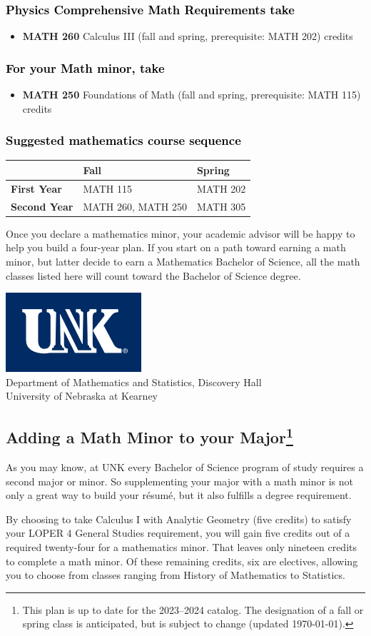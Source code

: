 \documentclass[10pt]{article}
\newcommand{\calconeshort}{MATH 115}
\newcommand{\calctwoshort}{MATH 202}
\newcommand{\foundations}{\textbf{MATH 250} Foundations of Math (fall and spring, prerequisite: MATH 115)  \dotfill 3 credits}
\newcommand{\foundationsshort}{MATH 250}
\newcommand{\calcthree}{\textbf{MATH 260} Calculus III  (fall and spring, prerequisite: MATH 202) \dotfill 5 credits}
\newcommand{\calcthreeshort}{MATH 260}
\newcommand{\diffeqshort}{MATH 305}
\newcommand{\catalog}{2023--2024 }
\newcommand{\LOPER}{LOPER\xspace}
\newcommand{\myfootnote}{\footnote{This plan is up to date for  the \catalog catalog. The designation of a fall or spring class is 
anticipated, but  is subject to change (updated \today).}}
\newcommand{\myheading}{
\begin{flushleft}
\includegraphics[scale=0.35]{unk-logo}\\
\setcounter{footnote}{0}
\vspace{0.25in}
 \textcolor{unkblue}{Department of Mathematics and Statistics, Discovery Hall} \\
  \textcolor{unkblue}{University of Nebraska at Kearney}
\end{flushleft}}
\newcommand{\mathminorALT}{
\begin{center}
   \begin{tabular}[h]{| l | l | l|} 
      \hline
                 & \textbf{Fall}         &  \textbf{Spring}  \\ \hline 
      \textbf{First Year} & \calconeshort & \calctwoshort{}  \\  \hline
      \textbf{Second Year} &  \calcthreeshort{},  \foundationsshort{}  & \diffeqshort \\ \hline
         \end{tabular}
      \end{center}}
\begin{document}
\subsubsection*{\textcolor{black}{Physics Comprehensive Math Requirements take}}
\begin{itemize}
 \item \calcthree
\end{itemize}

\subsubsection*{\textcolor{black}{For your Math minor, take}}
\begin{itemize}
\item \foundations
\end{itemize}

\subsubsection*{\textcolor{black}{Suggested mathematics course sequence}}

\mathminorALT

\vspace{0.1in}
  

 \noindent Once you declare a mathematics minor, your academic advisor will be 
 happy to help you build a four-year plan. If you start on a path toward earning 
 a math minor, but latter decide to earn a  Mathematics Bachelor of Science, 
 all the math classes listed here will count toward the Bachelor of Science degree.




\newpage

\myheading

\subsection*{\textbf{\textcolor{unkblue}{Adding a Math Minor to your Major\myfootnote}}}

As you may know, at UNK every Bachelor of Science program of study requires a second
major or minor. So supplementing your major with a math minor is not only a great
way to build your r\'esum\'e, but it also fulfills a degree requirement.

By choosing to take Calculus I with Analytic Geometry (five credits) to satisfy
your \LOPER 4 General Studies requirement, you will gain five credits out of a
required twenty-four for a mathematics minor. That leaves only nineteen credits
to complete a math minor.  Of these remaining credits, six are electives, allowing
you to choose from classes ranging from History of Mathematics to Statistics.
\end{document}
